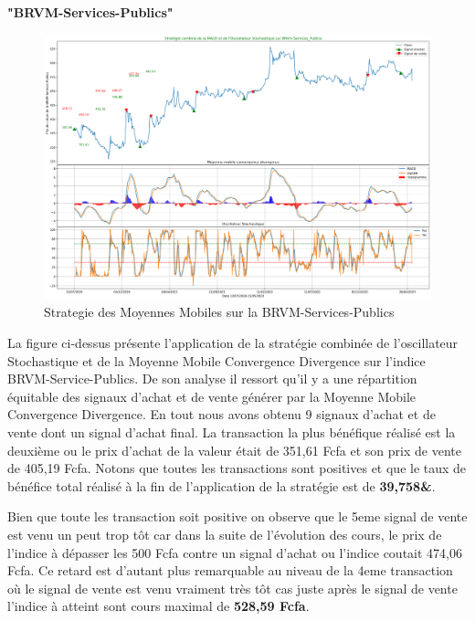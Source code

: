 \begin{center}     \textbf{"BRVM-Services-Publics"}  \end{center}
\begin{figure}[h]
    \centering
    \includegraphics[width=1 \textwidth ]{img/MACD-Public.png}
    \caption{Strategie des Moyennes Mobiles sur la BRVM-Services-Publics}
    \label{fig:Strategie des Moyennes Mobiles sur la BRVM-Services-Publics}
\end{figure}

\par{La figure ci-dessus présente l'application de la stratégie combinée de l'oscillateur 
Stochastique et de la Moyenne Mobile Convergence Divergence sur l'indice BRVM-Service-Publics.
De son analyse il ressort qu'il y a une répartition équitable des signaux d'achat et de vente
générer par la Moyenne Mobile Convergence Divergence. En tout nous avons obtenu 
9 signaux d'achat et de vente dont un signal d'achat final. La transaction
la plus bénéfique réalisé est la deuxième ou le prix d'achat de la valeur était 
de 351,61 Fcfa et son prix de vente de 405,19 Fcfa. Notons que toutes les transactions 
sont positives et que le taux de bénéfice total réalisé à la fin de l'application de 
la stratégie est de \textbf{39,758\&}.

Bien que toute les transaction soit 
positive on observe que le 5eme signal de vente est venu un peut trop tôt 
car dans la suite de l'évolution des cours, le prix de l'indice à dépasser les 
500 Fcfa contre un signal d'achat ou l'indice coutait 474,06 Fcfa. Ce retard est 
d'autant plus remarquable au niveau de la 4eme transaction où le signal de vente est 
venu vraiment très tôt cas juste après le signal de vente l'indice à atteint sont 
cours maximal de \textbf{ 528,59 Fcfa}.}





